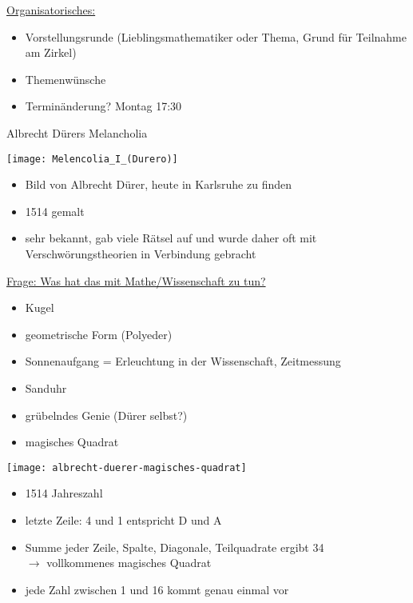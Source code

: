 \documentclass{uebungszettel}
\begin{document}
	
\pagestyle{plain}
\setlength{\aufgabenskip}{1.5em}
	
	
	
\thispagestyle{plain}

\underline{Organisatorisches:}
\begin{itemize}
	\item Vorstellungsrunde (Lieblingsmathematiker oder Thema, Grund f\"ur Teilnahme am Zirkel)
	\item Themenw\"unsche
	\item Termin\"anderung? Montag 17:30 
\end{itemize}

\begin{aufgabe}{Albrecht D\"urers Melancholia}
	\begin{center}
		
	\texttt{[image: Melencolia\_I\_(Durero)]}
	\end{center}

	\begin{itemize}
		\item Bild von Albrecht D\"urer, heute in Karlsruhe zu finden
		\item 1514 gemalt
		\item sehr bekannt, gab viele R\"atsel auf und wurde daher oft mit 		 Verschw\"orungstheorien in Verbindung gebracht
	\end{itemize}
\pagebreak
\underline{Frage: Was hat das mit Mathe/Wissenschaft zu tun?}
\begin{itemize}
	\item Kugel
	\item geometrische Form (Polyeder)
	\item Sonnenaufgang = Erleuchtung in der Wissenschaft, Zeitmessung
	\item Sanduhr
	\item gr\"ubelndes Genie (D\"urer selbst?)
	\item magisches Quadrat	
\end{itemize}

	\begin{center}
		\texttt{[image: albrecht-duerer-magisches-quadrat]}
	\end{center}

\begin{itemize}
	\item 1514 Jahreszahl
	\item letzte Zeile: 4 und 1 entspricht D und A
	\item Summe jeder Zeile, Spalte, Diagonale, Teilquadrate ergibt 34\\
	$\rightarrow$ vollkommenes magisches Quadrat
	\item jede Zahl zwischen 1 und 16 kommt genau einmal vor
\end{itemize}
\end{aufgabe}	
\end{document}
